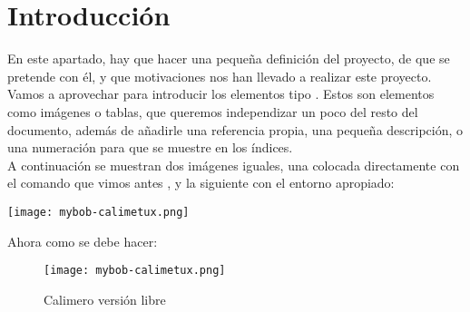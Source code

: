 

\section{Introducción}

En este apartado, hay que hacer una pequeña definición del proyecto,
de que se pretende con él, y que motivaciones nos han llevado a
realizar este proyecto.\\ 

Vamos a aprovechar para introducir los elementos tipo
. Estos son elementos como imágenes o tablas, que
queremos independizar un poco del resto del documento, además de
añadirle una referencia propia, una pequeña descripción, o una
numeración para que se muestre en los índices.\\

A continuación se muestran dos imágenes iguales, una colocada
directamente con el comando que vimos antes
, y la siguiente con el entorno
apropiado:
\begin{center}
\texttt{[image: mybob-calimetux.png]}
\end{center}

Ahora como se debe hacer:

\begin{figure}[H] %
  
  \label{cal-tux} %
  \begin{center}
    \texttt{[image: mybob-calimetux.png]}
  \end{center}
  \caption{Calimero versión libre}
\end{figure}

